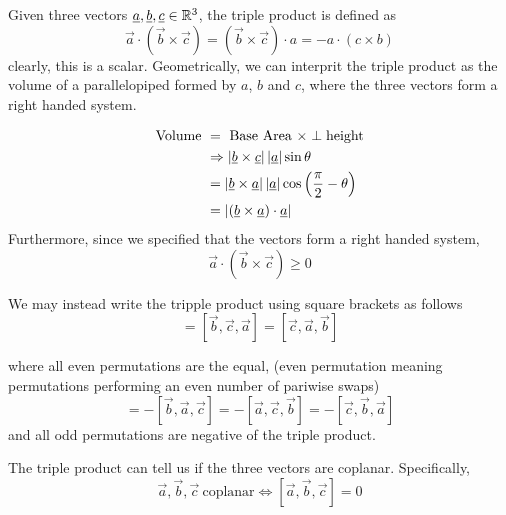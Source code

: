 \documentclass{article}
\numberwithin{equation}{section}
\begin{document}
\begin{defi}
    Given three vectors $\underline{a}, \underline{b}, \underline{c} \in \mathbb{R}^3$, the triple product is defined as
    \begin{equation}
        \vec{a} \cdot (\vec{b} \times \vec{c}) = (\vec{b} \times \vec{c}) \cdot a = -a \cdot (c \times b)
    \end{equation}
    clearly, this is a scalar. Geometrically, we can interprit the triple product as the volume of a parallelopiped formed by $a$, $b$ and $c$, where the three vectors form a right handed system.
    
    \begin{align*}
        \text{Volume} \ &= \ \text{Base Area} \ \times \perp \text{height} \\
        &\Rightarrow \left\lvert \underline{b} \times \underline{c}\right\rvert \left\lvert \underline{a}\right\rvert \sin{\theta} \\
        &= \left\lvert \underline{b} \times \underline{a}\right\rvert\left\lvert \underline{a}\right\rvert\cos{\left( \frac{\pi}{2} - \theta \right)} \\
        &= \left\lvert (\underline{b} \times \underline{a}) \cdot \underline{a}\right\rvert
    \end{align*}
    Furthermore, since we specified that the vectors form a right handed system,
    \[
        \vec{a} \cdot (\vec{b} \times \vec{c}) \geq 0
    \]
\end{defi}

\begin{notation}
    We may instead write the tripple product using square brackets as follows
    \begin{equation}
        [\vec{a}, \vec{b}, \vec{c}] = [\vec{b}, \vec{c}, \vec{a}] =  [\vec{c}, \vec{a}, \vec{b}]
    \end{equation}

    where all even permutations are the equal, (even permutation meaning permutations performing an even number of pariwise swaps)
    \begin{equation}
        [\vec{a}, \vec{b}, \vec{c}] = - [\vec{b}, \vec{a}, \vec{c}] = - [\vec{a}, \vec{c}, \vec{b}] = - [\vec{c}, \vec{b}, \vec{a}]
    \end{equation}
    and all odd permutations are negative of the triple product.
\end{notation}

\begin{remark}
    The triple product can tell us if the three vectors are coplanar. Specifically,
    \begin{equation}
        \vec{a}, \vec{b}, \vec{c} \ \text{coplanar} \Leftrightarrow [\vec{a}, \vec{b}, \vec{c}] = 0  
    \end{equation}
\end{remark}
\end{document}
